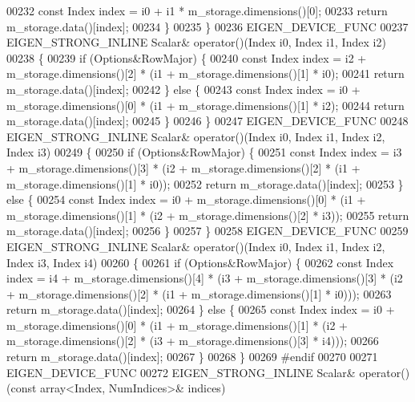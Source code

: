 \begin{DoxyCode}
00232         \textcolor{keyword}{const} Index index = i0 + i1 * m\_storage.dimensions()[0];
00233         \textcolor{keywordflow}{return} m\_storage.data()[index];
00234       \}
00235     \}
00236     EIGEN\_DEVICE\_FUNC
00237     EIGEN\_STRONG\_INLINE Scalar& operator()(Index i0, Index i1, Index i2)
00238     \{
00239        \textcolor{keywordflow}{if} (Options&RowMajor) \{
00240          \textcolor{keyword}{const} Index index = i2 + m\_storage.dimensions()[2] * (i1 + m\_storage.dimensions()[1] * i0);
00241         \textcolor{keywordflow}{return} m\_storage.data()[index];
00242       \} \textcolor{keywordflow}{else} \{
00243          \textcolor{keyword}{const} Index index = i0 + m\_storage.dimensions()[0] * (i1 + m\_storage.dimensions()[1] * i2);
00244         \textcolor{keywordflow}{return} m\_storage.data()[index];
00245       \}
00246     \}
00247     EIGEN\_DEVICE\_FUNC
00248     EIGEN\_STRONG\_INLINE Scalar& operator()(Index i0, Index i1, Index i2, Index i3)
00249     \{
00250       \textcolor{keywordflow}{if} (Options&RowMajor) \{
00251         \textcolor{keyword}{const} Index index = i3 + m\_storage.dimensions()[3] * (i2 + m\_storage.dimensions()[2] * (i1 + 
      m\_storage.dimensions()[1] * i0));
00252         \textcolor{keywordflow}{return} m\_storage.data()[index];
00253       \} \textcolor{keywordflow}{else} \{
00254         \textcolor{keyword}{const} Index index = i0 + m\_storage.dimensions()[0] * (i1 + m\_storage.dimensions()[1] * (i2 + 
      m\_storage.dimensions()[2] * i3));
00255         \textcolor{keywordflow}{return} m\_storage.data()[index];
00256       \}
00257     \}
00258     EIGEN\_DEVICE\_FUNC
00259     EIGEN\_STRONG\_INLINE Scalar& operator()(Index i0, Index i1, Index i2, Index i3, Index i4)
00260     \{
00261       \textcolor{keywordflow}{if} (Options&RowMajor) \{
00262         \textcolor{keyword}{const} Index index = i4 + m\_storage.dimensions()[4] * (i3 + m\_storage.dimensions()[3] * (i2 + 
      m\_storage.dimensions()[2] * (i1 + m\_storage.dimensions()[1] * i0)));
00263         \textcolor{keywordflow}{return} m\_storage.data()[index];
00264       \} \textcolor{keywordflow}{else} \{
00265         \textcolor{keyword}{const} Index index = i0 + m\_storage.dimensions()[0] * (i1 + m\_storage.dimensions()[1] * (i2 + 
      m\_storage.dimensions()[2] * (i3 + m\_storage.dimensions()[3] * i4)));
00266         \textcolor{keywordflow}{return} m\_storage.data()[index];
00267       \}
00268     \}
00269 \textcolor{preprocessor}{#endif}
00270 
00271     EIGEN\_DEVICE\_FUNC
00272     EIGEN\_STRONG\_INLINE Scalar& operator()(\textcolor{keyword}{const} array<Index, NumIndices>& indices)

\end{DoxyCode}
